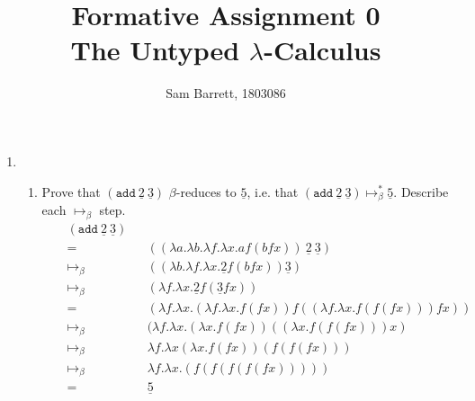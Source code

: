 \documentclass[11pt]{article}
\title{Formative Assignment 0 \\ The Untyped $\lambda$-Calculus}
\author{Sam Barrett, 1803086}
\begin{document}
 
\maketitle

\begin{enumerate}

	\item
	      \begin{enumerate}
		      \item Prove that $(\texttt{add}\: \underline{2} \: \underline{3})$ $\beta$-reduces to $\underline{5}$, i.e. that $(\texttt{add}\: \underline{2} \: \underline{3}) \mapsto^*_{\beta} \underline{5}$. Describe each $\mapsto_\beta$ step.
		            \begin{align*}
			             &  & (\texttt{add} \: \underline{2} \: \underline{3}) &                                                                                                     \\
			             &  & =                                                &   & ((\lambda a.\lambda b. \lambda f. \lambda x. a f ( b f x)) \: \underline{2} \: \underline{3}) & \\
			             &  & \mapsto_\beta                                    &   & ((\lambda b. \lambda f . \lambda x . \underline{2} f (b f x))\underline{3})                   & \\
			             &  & \mapsto_\beta                                    &   & (\lambda f. \lambda x. \underline{2}f(\underline{3} f x))                                     & \\
			             &  & =                                                &   & (\lambda f. \lambda x. (\lambda f.\lambda x.f(f x))f((\lambda f.\lambda x. f(f(f x)))f x))    & \\
			             &  & \mapsto_\beta                                    &   & ( \lambda f. \lambda x. ( \lambda x. f ( f x))(( \lambda x. f(f(f x)))x)                      & \\
			             &  & \mapsto_\beta                                    &   & \lambda f. \lambda x ( \lambda x. f (f x))(f ( f(f x)))                                       & \\
			             &  & \mapsto_\beta                                    &   & \lambda f. \lambda x.(f (f (f(f(f x)))))                                                      & \\
			             &  & =                                                &   & \underline{5}
		            \end{align*}



\end{enumerate}
\end{enumerate}
\end{document}
